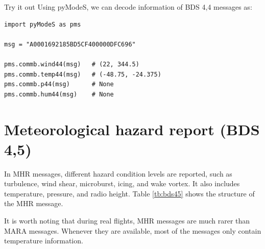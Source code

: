 \begin{notebox}{Try it out}
Using pyModeS, we can decode information of BDS 4,4 messages as: 

\begin{verbatim}
import pyModeS as pms

msg = "A0001692185BD5CF400000DFC696"

pms.commb.wind44(msg)   # (22, 344.5)
pms.commb.temp44(msg)   # (-48.75, -24.375)
pms.commb.p44(msg)      # None
pms.commb.hum44(msg)    # None
\end{verbatim}

\end{notebox}

\clearpage
\section{Meteorological hazard report (BDS 4,5)}

In MHR messages, different hazard condition levels are reported, such as turbulence, wind shear, microburst, icing, and wake vortex. It also includes temperature, pressure, and radio height. Table \ref{tb:bds45} shows the structure of the MHR message.

It is worth noting that during real flights, MHR messages are much rarer than MARA messages. Whenever they are available, most of the messages only contain temperature information.

